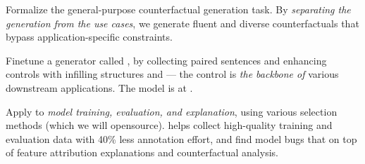 \begin{compactenum}
\item  Formalize the general-purpose counterfactual generation task. 
By \emph{separating the generation from the use cases}, we generate fluent and diverse counterfactuals that bypass application-specific constraints.
\item Finetune a generator called \sysname, by collecting paired sentences and enhancing controls with infilling structures and \tagstrs --- the control is \emph{the backbone of} various downstream applications.
The model is at \modelurl.
\item Apply \sysname to \emph{model training, evaluation, and explanation}, using various selection methods (which we will opensource).
\sysname helps collect high-quality training and evaluation data with 40\% less annotation effort, and find model bugs that on top of feature attribution explanations and counterfactual analysis.
\end{compactenum}


